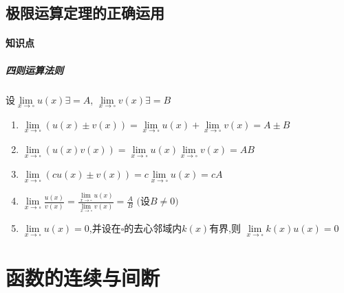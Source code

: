 \subsection{极限运算定理的正确运用}
    \paragraph{知识点}
        \subparagraph{四则运算法则}
            设$\lim\limits_{x\rightarrow \square}u(x) \exists = A$, $\lim\limits_{x\rightarrow \square}v(x) \exists = B$
            \begin{enumerate}
                \item $\lim\limits_{x\rightarrow \square}(u(x)\pm v(x)) = \lim\limits_{x\rightarrow \square}u(x) + \lim\limits_{x\rightarrow \square}v(x) = A \pm B$
                \item $\lim\limits_{x\rightarrow \square}(u(x)v(x)) = \lim\limits_{x\rightarrow \square}u(x)\lim\limits_{x\rightarrow \square}v(x) = AB$
                \item $\lim\limits_{x\rightarrow \square}(cu(x)\pm v(x)) = c\lim\limits_{x\rightarrow \square}u(x) = cA$
                \item $\lim\limits_{x\rightarrow \square}\frac{u(x)}{v(x)} =
                \frac{\lim\limits_{x\rightarrow \square}u(x)}{\lim\limits_{x\rightarrow \square}v(x)} = \frac{A}{B}$ $($设$B\ne 0)$
                \item  $\lim\limits_{x\rightarrow \square}u(x) = 0$,并设在$\square$的去心邻域内$k(x)$有界,则 $\lim\limits_{x\rightarrow \square}k(x)u(x) = 0$
            \end{enumerate}
\section{函数的连续与间断}
